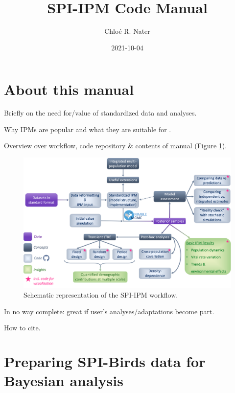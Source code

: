 \documentclass[
]{book}
\title{SPI-IPM Code Manual}
\author{Chloé R. Nater}
\date{2021-10-04}
\begin{document}
\maketitle

{
\setcounter{tocdepth}{1}
\tableofcontents
}
\hypertarget{about-this-manual}{%
\chapter*{About this manual}\label{about-this-manual}}

Briefly on the need for/value of standardized data and analyses.

Why IPMs are popular and what they are suitable for \citep{kery2011, plard2019}.

Overview over workflow, code repository \& contents of manual (Figure \ref{fig:WorkflowDiag}).

\begin{figure}

{\centering \includegraphics[width=1\linewidth]{Figures/SPI-IPM_Workflow} 

}

\caption{Schematic representation of the SPI-IPM workflow.}\label{fig:WorkflowDiag}
\end{figure}

In no way complete: great if user's analyses/adaptations become part.

How to cite.

\hypertarget{DataPrep}{%
\chapter{Preparing SPI-Birds data for Bayesian analysis}\label{DataPrep}}
\end{document}
